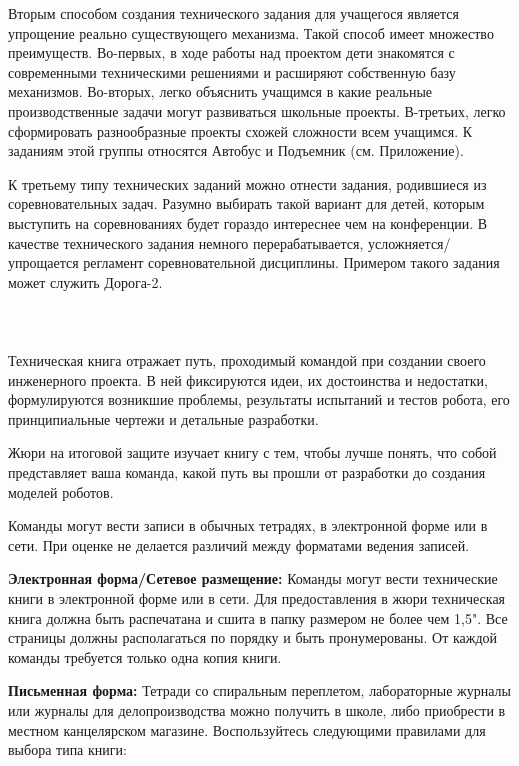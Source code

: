 Вторым способом создания технического задания для учащегося является упрощение реально существующего механизма. Такой способ имеет множество преимуществ. Во-первых, в ходе работы над проектом дети знакомятся с современными техническими решениями и расширяют собственную базу механизмов. Во-вторых, легко объяснить учащимся в какие реальные производственные задачи могут развиваться школьные проекты. В-третьих, легко сформировать разнообразные проекты схожей сложности всем учащимся. К заданиям этой группы относятся Автобус и Подъемник (см. Приложение).

К третьему типу технических заданий можно отнести задания, родившиеся из соревновательных задач.  Разумно выбирать такой вариант для детей, которым выступить на соревнованиях будет гораздо интереснее чем на конференции. В качестве технического задания немного перерабатывается, усложняется/упрощается регламент соревновательной дисциплины. Примером такого задания может служить Дорога-2.\\\\

{\hypertarget{lesson23x3}{}}\\\\

Техническая книга отражает путь, проходимый командой при создании своего инженерного проекта. В ней фиксируются идеи, их достоинства и недостатки, формулируются возникшие проблемы, результаты испытаний и тестов робота, его принципиальные чертежи и детальные разработки.

Жюри на итоговой защите изучает книгу с тем, чтобы лучше понять, что собой представляет ваша команда, какой путь вы прошли от разработки до создания моделей роботов.

Команды могут вести записи в обычных тетрадях, в электронной форме или в сети. При оценке не делается различий между форматами ведения записей.

{\bfseries Электронная форма/Сетевое размещение:} Команды могут вести технические книги в электронной форме или в сети. Для предоставления в жюри техническая книга должна быть распечатана и сшита в папку размером не более чем 1,5". Все страницы должны располагаться по порядку и быть пронумерованы. От каждой команды требуется только одна копия книги.

{\bfseries Письменная форма:} Тетради со спиральным переплетом, лабораторные журналы или журналы для делопроизводства можно получить в школе, либо приобрести в местном канцелярском магазине. Воспользуйтесь следующими правилами для выбора типа книги:

